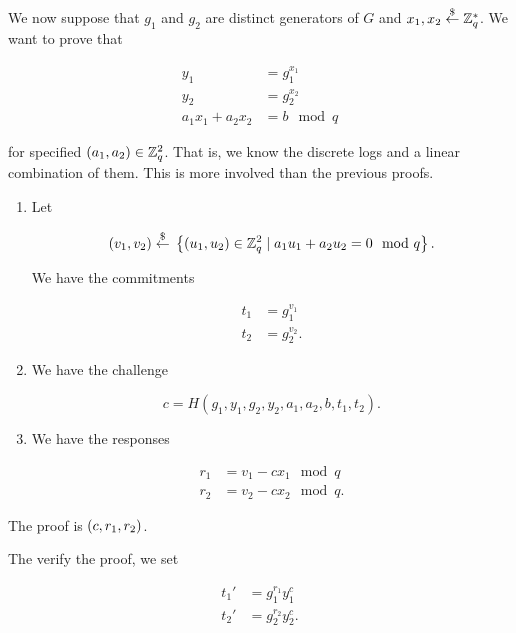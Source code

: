 We now suppose that $g_{1}$ and $g_{2}$ are distinct generators of $G$
and  $x_{1},x_{2}\stackrel{\$}{\leftarrow}{}\mathbb{Z}_{q}^{*}$.
We want to prove that

\begin{align}
    y_{1} &= g_{1}^{x_{1}} \nonumber\\
    y_{2} &= g_{2}^{x_{2}} \nonumber\\
    a_{1}x_{1} + a_{2}x_{2} &= b \mod q
\end{align}

\noindent
for specified $\left( a_{1},a_{2} \right)\in\mathbb{Z}_{q}^{2}$.
That is, we know the \glspl{discrete log} and a linear combination of them.
This is more involved than the previous proofs.

\begin{enumerate}
\item Let 

\begin{equation}
    \left( v_{1},v_{2} \right)\stackrel{\$}{\leftarrow}{}
        \left\{ \left( u_{1},u_{2} \right)\in\mathbb{Z}_{q}^{2}
            \mid a_{1}u_{1} + a_{2}u_{2} = 0 \mod q \right\}.
\end{equation}

We have the commitments

\begin{align}
    t_{1} &= g_{1}^{v_{1}} \nonumber\\
    t_{2} &= g_{2}^{v_{2}}.
\end{align}

\item We have the challenge

\begin{equation}
    c = H(g_{1},y_{1},g_{2},y_{2},a_{1},a_{2},b,t_{1},t_{2}).
\end{equation}

\item We have the responses

\begin{align}
    r_{1} &= v_{1} - cx_{1} \mod q \nonumber\\
    r_{2} &= v_{2} - cx_{2} \mod q.
\end{align}
\end{enumerate}

\noindent
The proof is $\left( c,r_{1},r_{2} \right)$.

The verify the proof, we set

\begin{align}
    t_{1}' &= g_{1}^{r_{1}}y_{1}^{c} \nonumber\\
    t_{2}' &= g_{2}^{r_{2}}y_{2}^{c}.
\end{align}

